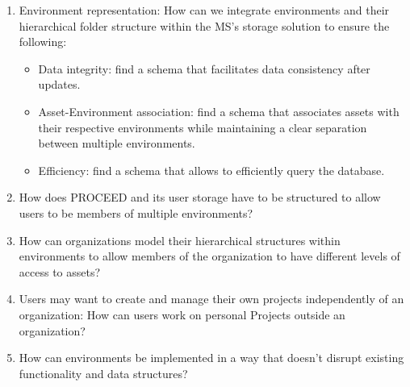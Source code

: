 \begin{enumerate}

	\item Environment representation: How can we integrate environments and their hierarchical
	      folder structure within the MS's storage solution to ensure the following:
	      \begin{itemize}
		      \item Data integrity: find a schema that facilitates data consistency after updates.
		      \item Asset-Environment association: find a schema that associates assets with their
		            respective environments while maintaining a clear separation between
		            multiple environments.
		      \item Efficiency: find a schema that allows to efficiently query the database.
	      \end{itemize}

	\item How does PROCEED and its user storage have to be structured to allow users to be
	      members of multiple environments?

	\item How can organizations model their hierarchical structures within environments
	      to allow members of the organization to have different levels of access to assets?

	\item Users may want to create and manage their own projects independently of an
	      organization: How can users work on personal Projects outside an organization?

	\item How can environments be implemented in a way that doesn't disrupt existing
	      functionality and data structures?





\end{enumerate}
